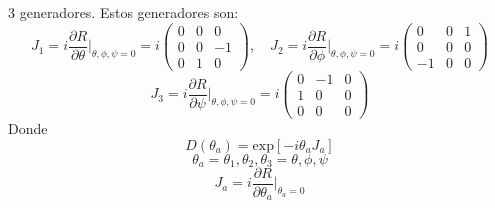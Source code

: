 \documentclass[a4paper,12pt]{article}
\begin{document}
3 generadores. 
Estos generadores son: 
\[
J_1 = i \frac{\partial R}{\partial\theta}\big|_{\theta,\phi, \psi =0} = i\begin{pmatrix}
    0&0&0\\0&0&-1\\0&1&0
\end{pmatrix}, \quad J_2 = i \frac{\partial R}{\partial\phi}\big|_{\theta,\phi, \psi =0} = i\begin{pmatrix}
    0&0&1\\0&0&0\\-1&0&0
\end{pmatrix} 
\]
\[
J_3 = i \frac{\partial R}{\partial\psi}\big|_{\theta,\phi, \psi =0} = i\begin{pmatrix}
    0&-1&0\\1&0&0\\0&0&0
\end{pmatrix}
\]
Donde 
\[ 
D(\theta_a)  = \text{exp}[-i \theta_a J_a ]
\]
\[
\theta_a= \theta_1,\theta_2,\theta_3 = \theta, \phi, \psi 
\]
\[
J_a = i \frac{\partial R}{\partial\theta_a }\big|_{\theta_a =0}
\]
\end{document}
